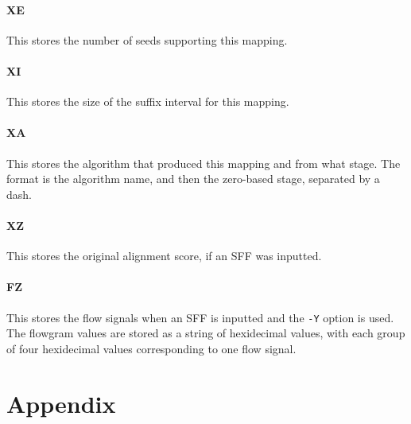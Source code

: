 \documentclass[a4paper,12pt]{book}
\newcommand{\TT}[1]{{\tt #1}} %
\begin{document}
\subsubsection{XE}
This stores the number of seeds supporting this mapping.

\subsubsection{XI}
This stores the size of the suffix interval for this mapping.

\subsubsection{XA}
This stores the algorithm that produced this mapping and from what stage.
The format is the algorithm name, and then the zero-based stage, separated by a dash.

\subsubsection{XZ}
This stores the original alignment score, if an SFF was inputted.

\subsubsection{FZ}
This stores the flow signals when an SFF is inputted and the \TT{-Y} option is used.
The flowgram values are stored as a string of hexidecimal values, with each group of four hexidecimal values corresponding to one flow signal.

\chapter{Appendix}

{}


\end{document}
